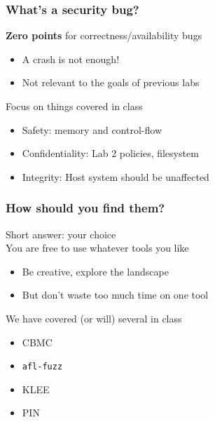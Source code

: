 \documentclass[10pt,xcolor={dvipsnames}]{beamer}
\begin{document}

\begin{frame}

\frametitle{What's a security bug?}

\textbf{Zero points} for correctness/availability bugs
\begin{itemize}
\item A crash is not enough!
\item Not relevant to the goals of previous labs\\[1em]
\end{itemize}

\pause Focus on things covered in class
\begin{itemize}
\item Safety: memory and control-flow
\item Confidentiality: Lab 2 policies, filesystem
\item Integrity: Host system should be unaffected\\[1em]
\end{itemize}

\end{frame}


\begin{frame}

\frametitle{How should you find them?}

Short answer: your choice
\\[1em]

\pause
You are free to use whatever tools you like
\begin{itemize}
\item Be creative, explore the landscape
\item But don't waste too much time on one tool\\[1em]
\end{itemize}

\pause
We have covered (or will) several in class
\begin{itemize}
\item CBMC
\item \texttt{afl-fuzz}
\item KLEE
\item PIN
\end{itemize}

\end{frame}

\end{document}
